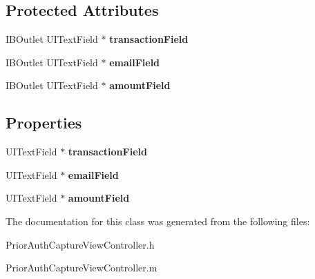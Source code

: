 \subsection*{Protected Attributes}
\begin{DoxyCompactItemize}
\item 
\hypertarget{interface_prior_auth_capture_view_controller_ab263729c9eb9d118a8d9a3d28e89697a}{
IBOutlet UITextField $\ast$ {\bfseries transactionField}}
\label{interface_prior_auth_capture_view_controller_ab263729c9eb9d118a8d9a3d28e89697a}

\item 
\hypertarget{interface_prior_auth_capture_view_controller_a42e5cea3da198e9109e59e1bc3018c7a}{
IBOutlet UITextField $\ast$ {\bfseries emailField}}
\label{interface_prior_auth_capture_view_controller_a42e5cea3da198e9109e59e1bc3018c7a}

\item 
\hypertarget{interface_prior_auth_capture_view_controller_a8bac957da28a48a685c3218ac6dfccfc}{
IBOutlet UITextField $\ast$ {\bfseries amountField}}
\label{interface_prior_auth_capture_view_controller_a8bac957da28a48a685c3218ac6dfccfc}

\end{DoxyCompactItemize}
\subsection*{Properties}
\begin{DoxyCompactItemize}
\item 
\hypertarget{interface_prior_auth_capture_view_controller_a51d2f91e0557b3ad32dac4d6167fa174}{
UITextField $\ast$ {\bfseries transactionField}}
\label{interface_prior_auth_capture_view_controller_a51d2f91e0557b3ad32dac4d6167fa174}

\item 
\hypertarget{interface_prior_auth_capture_view_controller_abbf439832c2a2031151b58ba183eec05}{
UITextField $\ast$ {\bfseries emailField}}
\label{interface_prior_auth_capture_view_controller_abbf439832c2a2031151b58ba183eec05}

\item 
\hypertarget{interface_prior_auth_capture_view_controller_a69a7a6d2834fe211893d44e625b8728f}{
UITextField $\ast$ {\bfseries amountField}}
\label{interface_prior_auth_capture_view_controller_a69a7a6d2834fe211893d44e625b8728f}

\end{DoxyCompactItemize}


The documentation for this class was generated from the following files:\begin{DoxyCompactItemize}
\item 
PriorAuthCaptureViewController.h\item 
PriorAuthCaptureViewController.m\end{DoxyCompactItemize}
